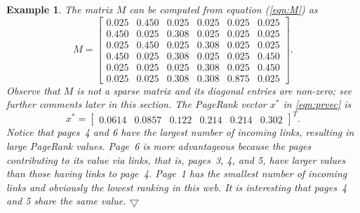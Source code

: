 \documentclass[11pt,draftcls,onecolumn]{IEEEtran}
\newtheorem{example}[theorem]{Example}
\newcommand{\End}{\hfill \mbox{$\bigtriangledown$}}
\begin{document}
\begin{example}\label{ex:2}\rm
The matrix $M$ can be computed from equation (\ref{eqn:M}) as
\begin{equation*}
 M = \begin{bmatrix}
       0.025 &   0.450  & 0.025 & 0.025 & 0.025 & 0.025\\
       0.450  &   0.025 & 0.308 & 0.025 & 0.025 & 0.025\\
       0.025 &   0.450  & 0.025 & 0.308 & 0.025 & 0.025\\
       0.450  &   0.025 & 0.308 & 0.025 & 0.025 & 0.450\\
       0.025 &   0.025 & 0.025 & 0.308 & 0.025 & 0.450\\
       0.025 &   0.025 & 0.308 & 0.308 & 0.875 & 0.025
     \end{bmatrix}.
\label{eqn:ex:origM}
\end{equation*}
Observe that $M$ is not a sparse matrix and its diagonal entries are non-zero; 
see further comments later in this section.
The PageRank vector $x^*$ in \eqref{eqn:prvec} is
\begin{equation}
  x^* = \begin{bmatrix}
           0.0614 & 0.0857 & 0.122 & 0.214 & 0.214 & 0.302
        \end{bmatrix}^T.
\label{eqn:ex:x_ast}        
\end{equation}
Notice that pages~4 and 6 have the largest number of incoming links,
resulting in large PageRank values.
Page~6 is more advantageous because the pages contributing to its value
via links, that is, pages~3, 4, and 5, 
have larger values than those having links to page~4. 
Page~1 has the smallest number
of incoming links and obviously the lowest ranking in this web. 
It is interesting that pages~4 and 5 share the same value. 
\End
\end{example}

\vspace{.5cm}
\end{document}
